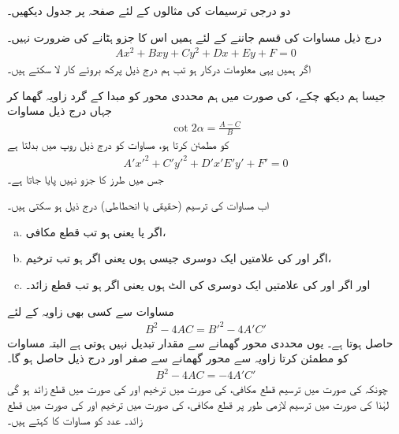 دو درجی ترسیمات کی مثالوں کے لئے صفحہ  پر جدول   دیکھیں۔

درج ذیل مساوات کی قسم جاننے کے لئے ہمیں اس کا جزو  ہٹانے کی ضرورت نہیں۔
\begin{align}\label{مساوات_مخروط_ممیز_پرکھ_الف}
Ax^2+Bxy+Cy^2+Dx+Ey+F=0
\end{align}
 اگر ہمیں یہی معلومات درکار ہو تب ہم درج  ذیل پرکھ بروئے کار لا سکتے ہیں۔

جیسا ہم دیکھ چکے،  کی صورت میں ہم محددی محور کو مبدا کے گرد  زاویہ گھما کر جہاں  درج ذیل مساوات
\begin{align}\label{مساوات_مخروط_ممیز_پرکھ_ب}
\cot 2\alpha=\frac{A-C}{B}
\end{align}
کو مطمئن کرتا ہو، مساوات  کو درج ذیل روپ میں بدلتا ہے
\begin{align}\label{مساوات_مخروط_ممیز_پرکھ_پ}
A'x'^2+C'y'^2+D'x'E'y'+F'=0
\end{align}
جس میں  طرز کا جزو نہیں پایا جاتا ہے۔

اب مساوات  کی ترسیم (حقیقی یا انحطاطی) درج ذیل ہو سکتی ہیں۔
\begin{enumerate}[a.]
\item
اگر  یا  یعنی  ہو تب قطع مکافی،
\item
اگر  اور  کی علامتیں ایک دوسری جیسی ہوں یعنی اگر  ہو تب ترخیم،
\item
اور اگر  اور  کی علامتیں ایک دوسری کی الٹ ہوں یعنی اگر  ہو تب قطع زائد۔
\end{enumerate}

مساوات  سے کسی بھی زاویہ کے لئے 
\begin{align}\label{مساوات_مخروط_تبدیل_نہیں_ہوتا}
B^2-4AC=B'^2-4A'C'
\end{align}
حاصل ہوتا ہے۔ یوں محددی محور گھمانے سے مقدار  تبدیل نہیں ہوتی ہے البتہ مساوات  کو مطمئن کرتا زاویہ  سے محور گھمانے سے  صفر اور درج ذیل حاصل ہو گا۔
\begin{align*}
B^2-4AC=-4A'C'
\end{align*}  
چونکہ  کی صورت میں ترسیم قطع مکافی،  کی صورت میں ترخیم اور  کی صورت میں قطع زائد ہو گی لہٰذا  کی صورت میں ترسیم لازمی طور پر قطع مکافی،  کی صورت میں ترخیم اور  کی صورت میں قطع زائد۔ عدد  کو مساوات  کا  کہتے ہیں۔


